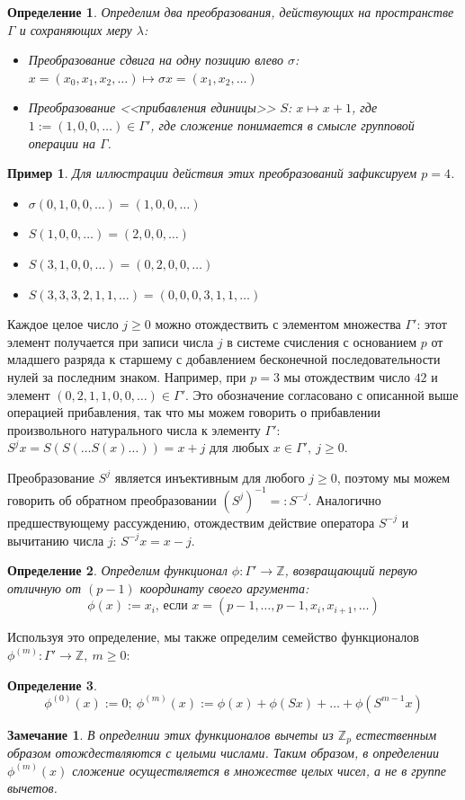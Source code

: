 \documentclass[14pt, a4paper, russian]{report}
\newtheorem{remark}{\indent Замечание}
\newtheorem{definition}{\indent Определение}
\newtheorem{example}{\indent Пример}
\begin{document}
\begin{definition} Определим два преобразования, действующих на пространстве $\Gamma$ и сохраняющих меру $\lambda$:
\begin{itemize}
\item Преобразование сдвига на одну позицию влево $\sigma$: $x=\left(x_0, x_1, x_2, \ldots \right) \mapsto \sigma x = \left(x_1, x_2, \ldots \right)$
\item Преобразование <<прибавления единицы>> $S$: $x \mapsto x + 1$, где $1:=(1,0,0,\ldots) \in \Gamma'$, где сложение понимается в смысле групповой операции на $\Gamma$. 
\end{itemize}
\end{definition}
\begin{example}
Для иллюстрации действия этих преобразований зафиксируем $p=4$. 
\begin{itemize}
\item $\sigma (0,1,0,0,\ldots) = (1, 0, 0, \ldots)$
\item $S(1,0,0,\ldots) = (2,0,0,\ldots)$
\item $S(3,1,0,0,\ldots) = (0,2,0,0,\ldots)$
\item $S(3,3,3,2,1,1,\ldots)=(0,0,0,3,1,1,\ldots)$
\end{itemize}
\end{example}

Каждое целое число $j \ge 0$ можно отождествить с элементом множества $\Gamma'$: этот элемент получается при записи числа $j$ в системе счисления с основанием $p$ от младшего разряда к старшему с добавлением бесконечной последовательности нулей за последним знаком. Например, при $p=3$ мы отождествим число $42$ и элемент $(0,2,1,1,0,0,\ldots) \in \Gamma'$. Это обозначение согласовано с описанной выше операцией прибавления, так что мы можем говорить о прибавлении произвольного натурального числа к элементу $\Gamma'$: $S^j x = S(S(\ldots S(x)\ldots)) = x + j$ для любых $x \in \Gamma',\ j \ge 0$.

Преобразование $S^j$ является инъективным для любого $j \ge 0$, поэтому мы можем говорить об обратном преобразовании $(S^j)^{-1} =: S^{-j}$. Аналогично предшествующему рассуждению, отождествим действие оператора $S^{-j}$ и вычитанию числа $j$: $S^{-j} x = x - j$.

\begin{definition}\label{phi}
Определим функционал $\phi: \Gamma' \to \mathbb{Z}$, возвращающий первую отличную от $(p-1)$ координату своего аргумента:
 \[\phi(x):=x_i\text{, если }x=(p-1, \ldots, p-1, x_i, x_{i+1}, \ldots)\]
\end{definition}
 Используя это определение, мы также определим семейство функционалов $\phi^{(m)}: \Gamma' \to \mathbb{Z},\ m \ge 0$:
\begin{definition}\label{phi_m}
    \[\phi^{(0)}(x):=0;\ \phi^{(m)}(x):=\phi(x)+\phi(Sx)+\ldots+\phi(S^{m-1}x)\]
\end{definition}
\begin{remark}
В определнии этих функционалов вычеты из $\mathbb{Z}_p$ естественным образом отождествляются с целыми числами. Таким образом, в определении $\phi^{(m)}(x)$ сложение осуществляется в множестве целых чисел, а не в группе вычетов.
\end{remark}
\end{document}
